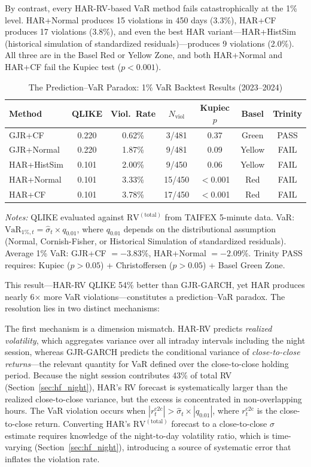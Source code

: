 By contrast, every HAR-RV-based VaR method fails catastrophically at the 1\% level. HAR+Normal produces 15 violations in 450 days (3.3\%), HAR+CF produces 17 violations (3.8\%), and even the best HAR variant---HAR+HistSim (historical simulation of standardized residuals)---produces 9 violations (2.0\%). All three are in the Basel Red or Yellow Zone, and both HAR+Normal and HAR+CF fail the Kupiec test ($p < 0.001$).

\begin{table}[H]
\centering
\caption{The Prediction--VaR Paradox: 1\% VaR Backtest Results (2023--2024)}
\label{tab:var_paradox}
\begin{tabular}{lcccccc}
\toprule
Method & QLIKE & Viol.\ Rate & $N_{\text{viol}}$ & Kupiec $p$ & Basel & Trinity \\
\midrule
GJR+CF & 0.220 & 0.62\% & 3/481 & 0.37 & Green & PASS \\
GJR+Normal & 0.220 & 1.87\% & 9/481 & 0.09 & Yellow & FAIL \\
HAR+HistSim & 0.101 & 2.00\% & 9/450 & 0.06 & Yellow & FAIL \\
HAR+Normal & 0.101 & 3.33\% & 15/450 & $<$0.001 & Red & FAIL \\
HAR+CF & 0.101 & 3.78\% & 17/450 & $<$0.001 & Red & FAIL \\
\bottomrule
\end{tabular}
\begin{flushleft}
\small \textit{Notes:} QLIKE evaluated against $\text{RV}^{(\text{total})}$ from TAIFEX 5-minute data. VaR: $\text{VaR}_{1\%,t} = \hat{\sigma}_t \times q_{0.01}$, where $q_{0.01}$ depends on the distributional assumption (Normal, Cornish-Fisher, or Historical Simulation of standardized residuals). Average 1\% VaR: GJR+CF $= -3.83\%$, HAR+Normal $= -2.09\%$. Trinity PASS requires: Kupiec ($p > 0.05$) + Christoffersen ($p > 0.05$) + Basel Green Zone.
\end{flushleft}
\end{table}

This result---HAR-RV QLIKE 54\% better than GJR-GARCH, yet HAR produces nearly 6$\times$ more VaR violations---constitutes a prediction--VaR paradox. The resolution lies in two distinct mechanisms:

The first mechanism is a dimension mismatch. HAR-RV predicts \textit{realized volatility}, which aggregates variance over all intraday intervals including the night session, whereas GJR-GARCH predicts the conditional variance of \textit{close-to-close returns}---the relevant quantity for VaR defined over the close-to-close holding period. Because the night session contributes 43\% of total RV (Section~\ref{sec:hf_night}), HAR's RV forecast is systematically larger than the realized close-to-close variance, but the excess is concentrated in non-overlapping hours. The VaR violation occurs when $|r_t^{\text{c2c}}| > \hat{\sigma}_t \times |q_{0.01}|$, where $r_t^{\text{c2c}}$ is the close-to-close return. Converting HAR's $\text{RV}^{(\text{total})}$ forecast to a close-to-close $\sigma$ estimate requires knowledge of the night-to-day volatility ratio, which is time-varying (Section~\ref{sec:hf_night}), introducing a source of systematic error that inflates the violation rate.

